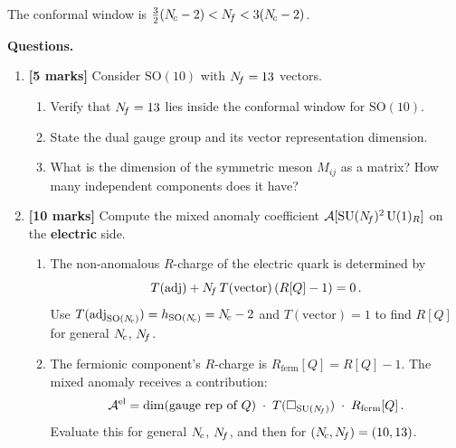\documentclass[11pt,a4paper]{article}
\newcommand{\SO}[1]{\mathrm{SO}(#1)}
\begin{document}
The conformal window is $\tfrac{3}{2}(N_{\!c} - 2) < N_{\!f} < 3(N_{\!c} - 2)$.

\medskip

\noindent\textbf{Questions.}
\begin{enumerate}[label=(\alph*)]

  \item \textbf{[5 marks]}
    Consider $\SO{10}$ with $N_{\!f} = 13$ vectors.
    \begin{enumerate}[label=(\roman*)]
      \item Verify that $N_{\!f} = 13$ lies inside the conformal window for
        $\SO{10}$.
      \item State the dual gauge group and its vector representation
        dimension.
      \item What is the dimension of the symmetric meson $M_{ij}$ as a
        matrix?  How many independent components does it have?
    \end{enumerate}

  \item \textbf{[10 marks]}
    Compute the mixed anomaly coefficient
    $\mathcal{A}[\mathrm{SU}(N_{\!f})^2\,\mathrm{U}(1)_R]$ on the \textbf{electric} side.

    \begin{enumerate}[label=(\roman*)]
      \item The non-anomalous $R$-charge of the electric quark is
        determined by
        \[
          T(\mathrm{adj}) + N_{\!f}\,T(\text{vector})\,(R[Q] - 1) = 0\,.
        \]
        Use $T(\adj_{\SO{\Nc}}) = h_{\SO{\Nc}} = \Nc - 2$ and
        $T(\text{vector}) = 1$ to find $R[Q]$ for general $N_{\!c}$, $N_{\!f}$.

      \item The fermionic component's $R$-charge is
        $R_{\text{ferm}}[Q] = R[Q] - 1$.  The mixed anomaly receives
        a contribution:
        \[
          \mathcal{A}^{\text{el}}
          = \dim(\text{gauge rep of } Q)\;\cdot\;
            T(\square_{\mathrm{SU}(N_{\!f})})\;\cdot\; R_{\text{ferm}}[Q]\,.
        \]
        Evaluate this for general $N_{\!c}$, $N_{\!f}$, and then for
        $(N_{\!c}, N_{\!f}) = (10, 13)$.
    \end{enumerate}


\end{enumerate}
\end{document}
